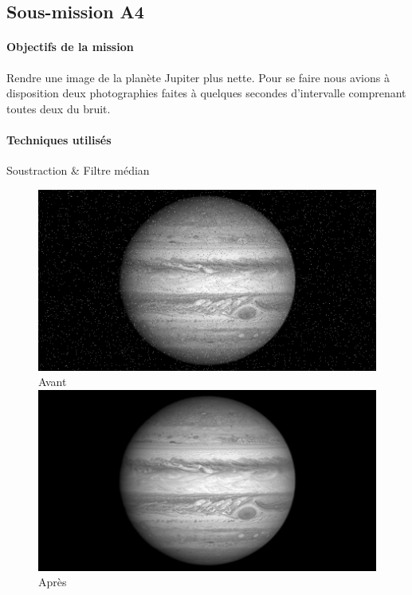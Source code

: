 	\subsection{Sous-mission A4}

	\begin{vwcol}[widths={0.65,0.2}, rule=0pt]
	\begin{minipage}{0.7\textwidth}
	\paragraph{Objectifs de la mission}

	Rendre une image de la planète Jupiter plus nette. Pour se faire nous avions à disposition deux photographies faites à quelques secondes d'intervalle comprenant toutes deux du bruit.
	\end{minipage}

	\begin{minipage}{0.3\textwidth}
	\begin{flushright}
	\paragraph{Techniques utilisés}

	Soustraction \& Filtre médian
	\end{flushright}
	\end{minipage}

	\end{vwcol} 

	\begin{figure}[h]
	\centering
		\begin{multicols}{2}
		\includegraphics[scale=0.325]{images/Jupiter.png}
		Avant
		\includegraphics[scale=0.325]{images/JupiterAp.png}
		Après
		\end{multicols}
	\end{figure}
	\vspace{-0.9cm}

